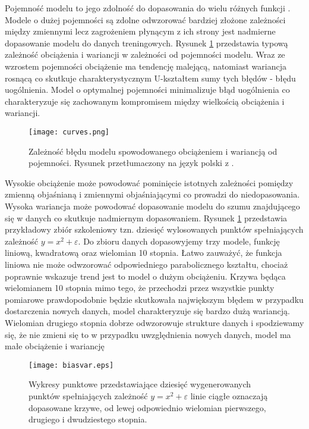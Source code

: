 \documentclass[11pt]{book}
\theoremstyle{definition}
\begin{document}
Pojemność modelu to jego zdolność do dopasowania do wielu różnych funkcji \cite{Goodfellow-et-al-2016}. Modele o dużej pojemności są zdolne odwzorować bardziej złożone zależności między zmiennymi lecz zagrożeniem płynącym z ich strony jest nadmierne dopasowanie modelu do danych treningowych. Rysunek \ref{fig:pojemnosc} przedstawia typową zależność obciążenia i wariancji w zależności od pojemności modelu. Wraz ze wzrostem pojemności obciążenie ma tendencję malejącą, natomiast wariancja rosnącą co skutkuje charakterystycznym U-kształtem sumy tych błędów - błędu uogólnienia. Model o optymalnej pojemności minimalizuje błąd uogólnienia co charakteryzuje się zachowanym kompromisem między wielkością obciążenia i wariancji. 
%
\begin{figure}[h!]
	\centering
	\texttt{[image: curves.png]}
	\caption{Zależność błędu modelu spowodowanego obciążeniem i wariancją od pojemności. Rysunek przetłumaczony na język polski z \cite{Goodfellow-et-al-2016}.}
	\label{fig:pojemnosc}
\end{figure}

Wysokie obciążenie może powodować pominięcie istotnych zależności pomiędzy zmienną objaśnianą i zmiennymi objaśniającymi co prowadzi do niedopasowania. Wysoka wariancja może powodować dopasowanie modelu do szumu znajdującego się w danych co skutkuje nadmiernym dopasowaniem. Rysunek \ref{fig:pojemnosc} przedstawia przykładowy zbiór szkoleniowy tzn. dziesięć wylosowanych punktów spełniających zależność $y = x^2 + \varepsilon$. Do zbioru danych dopasowyjemy trzy modele, funkcję liniową, kwadratową oraz wielomian 10 stopnia. Łatwo zauważyć, że funkcja liniowa nie może odwzorować odpowiedniego parabolicznego kształtu, chociaż poprawnie wskazuje trend jest to model o dużym obciążeniu. Krzywa będąca wielomianem 10 stopnia mimo tego, że przechodzi przez wszystkie punkty pomiarowe prawdopodobnie będzie skutkowała największym błędem w przypadku dostarczenia nowych danych, model charakteryzuje się bardzo dużą wariancją. Wielomian drugiego stopnia dobrze odwzorowuje strukture danych i spodziewamy się, że nie zmieni się to w przypadku uwzględnienia nowych danych, model ma małe obciążenie i wariancję

\begin{figure}[h!]
	\centering
	\texttt{[image: biasvar.eps]}
	\caption{Wykresy punktowe przedstawiające dziesięć wygenerowanych punktów spełniających zależność $y = x^2 + \varepsilon$ linie ciągłe oznaczają dopasowane krzywe, od lewej odpowiednio wielomian pierwszego, drugiego i dwudziestego stopnia.}
	\label{fig:biasvar}
\end{figure}
\end{document}
